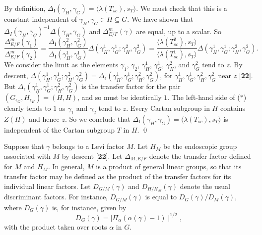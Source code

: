 \documentclass{amsart}
\begin{document}
By definition,
  $ \Delta_{\text{I}} (\gamma_H, \gamma_G) = 
    \big\langle
      \lambda (T_{sc}), s_T
    \big\rangle $.
We must check that this is a constant independent of
  $ \gamma_H,
    \gamma_G \in  H \subseteq G $.
We have shown that 
    $\Delta_I
     (\gamma_H, \gamma_G) ^{-1}
    \Delta
    (\gamma_H, \gamma_G) $ and
  $ \Delta_{E/F}^m (\gamma)$  
    are equal, up to a scalar.
So
%
\medskip
\begin{equation}\label{eqn:star}
  \frac
     { \Delta_{E/F}^m (\gamma_1) }
     { \Delta_{E/F}^m (\gamma_2) }
  =
  \frac
     { \Delta_{\text{I}} (\gamma_H^2, \gamma_G^2) }
     { \Delta_{\text{I}} (\gamma^{1}_H, \gamma^{1}_G) }
  \Delta
  ( \gamma^{1}_H, \gamma^{1}_G; \gamma_H^2, \gamma_G^2)
  =
  \frac
    { \langle \lambda (T_{sc}^2), s_T \rangle }
    { \langle \lambda (T^1_{sc}), s_T \rangle }
  \Delta
  ( \gamma^{1}_H, \gamma^{1}_G ; \gamma_H^2, \gamma_G^2) .
\tag{$*$}
\end{equation}
\medskip
%
We consider the limit as the elements $\gamma_1$, $\gamma_2$,
  $\gamma^{1}_H$, $\gamma^{1}_G$, $\gamma_H^2$, and $\gamma_G^2$ 
tend
to $z$.
%
By descent,
  $ \Delta
    (\gamma^{1}_H, \gamma^{1}_G ; \gamma_H^2, \gamma_G^2)
    =
    \Delta_{\epsilon} 
    (\gamma^{1}_H, \gamma^{1}_G ; \gamma_H^2, \gamma_G^2) $,
for
  $ \gamma^{1}_H, \gamma^{1}_G , \gamma_H^2, \gamma_G^2 $
near $z$ [{\bf 22}].
%
But 
  $ \Delta_{\epsilon}
    (\gamma^{1}_H, \gamma^{1}_G ; \gamma_H^2, \gamma_G^2) $
is the transfer factor for the pair
  $ (G_{\epsilon_G},  H_{\epsilon_H} ) =
     (H, H) $,
and so must be identically $1$.
The left-hand side of ($*$) clearly tends to $1$ as
  $ \gamma_1$ and $\gamma_2$ tend to  $z$.
Every Cartan subgroup in
  $ H $
contains 
  $ Z(H) $
and hence $z$.
So we conclude that
  $ \Delta_{\text{I}}
     (\gamma_H, \gamma_G ) =
    \langle 
      \lambda(T_{sc}), s_T 
    \rangle $
is independent of the Cartan subgroup $T$ in
  $ H $.
\qed\finishpproclaim

Suppose that $\gamma$ belongs to a Levi factor $M$.  Let
$H_M$ be the endoscopic group associated with $M$ by descent [{\bf 22}].
Let $\Delta_{M,E/F}$ denote the transfer factor defined
for $M$ and $H_M$.  In general, $M$ is a product of general
linear groups, so that its transfer factor may be defined
as the product of the transfer factors for its individual linear
factors. Let $D_{G/M}(\gamma)$ and $D_{H/H_M}(\gamma)$
denote the usual discriminant factors.  For instance,
$D_{G/M}(\gamma)$ is equal to $D_G(\gamma)/D_M(\gamma)$, where
$D_G(\gamma)$ is, for instance, given by
$$D_G(\gamma) = \mid \Pi_\alpha (\alpha(\gamma) - 1)\mid^{1/2},$$
with the product taken over roots $\alpha$ in $G$. 
\end{document}
